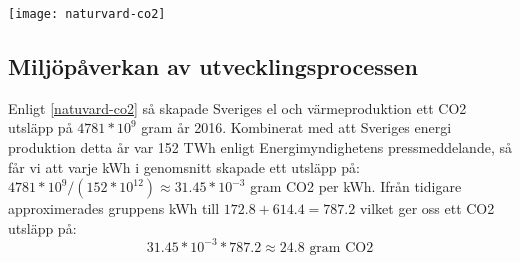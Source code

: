 \begin{figure*}[h]
	\texttt{[image: naturvard-co2]}
	\caption{Statistik ifrån naturvårdsverket}
	\label{natuvard-co2}
\end{figure*}


\subsection{Miljöpåverkan av utvecklingsprocessen}
Enligt \ref{natuvard-co2} så skapade Sveriges el och värmeproduktion ett CO2 utsläpp på $4781*10^9$ gram år 2016. Kombinerat med att Sveriges energi produktion detta år var 152 TWh enligt Energimyndighetens pressmeddelande\cite{elprod2016}, så får vi att varje kWh i genomsnitt skapade ett utsläpp på: $4781*10^9 / (152 * 10^{12}) \approx 31.45 * 10^{-3}$ gram CO2 per kWh. Ifrån tidigare approximerades gruppens kWh till $172.8 + 614.4 = 787.2$ vilket ger oss ett CO2 utsläpp på: $$31.45 * 10^{-3} * 787.2 \approx 24.8 \text{ gram CO2}$$
